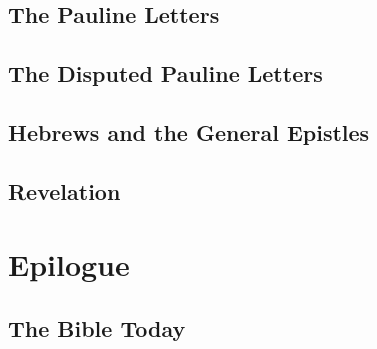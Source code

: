 \documentclass{report}
\begin{document}
    \chapter{The Pauline Letters}
    \chapter{The Disputed Pauline Letters}
    \chapter{Hebrews and the General Epistles}
    \chapter{Revelation}

\part{Epilogue}

    \chapter{The Bible Today}
\end{document}
